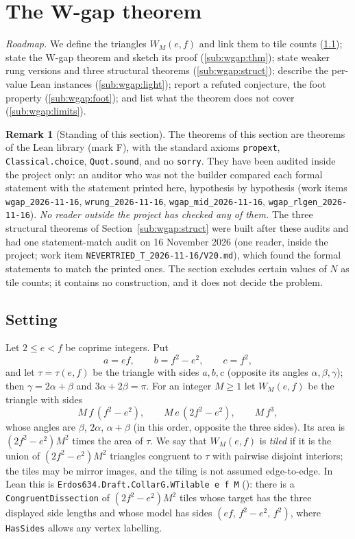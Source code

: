 \documentclass[11pt,reqno]{amsart}
\theoremstyle{plain}
\theoremstyle{definition}
\newtheorem{remark}[theorem]{Remark}
\newcommand{\sF}{\textup{\textsf{F}}}
\newcommand{\rec}[1]{\textup{\texttt{#1}}}
\begin{document}
\section{The W-gap theorem}\label{sec:wgap}

\emph{Roadmap.} We define the triangles $W_M(e,f)$ and link them to tile counts (\ref{sub:wgap:setting}); state the
W-gap theorem and sketch its proof (\ref{sub:wgap:thm}); state weaker rung versions and three structural theorems
(\ref{sub:wgap:struct}); describe the per-value Lean instances (\ref{sub:wgap:light}); report a refuted conjecture,
the foot property (\ref{sub:wgap:foot}); and list what the theorem does not cover (\ref{sub:wgap:limits}).

\begin{remark}[Standing of this section]\label{rem:wgap:status}
The theorems of this section are theorems of the Lean library (mark \sF), with the standard axioms
\texttt{propext}, \texttt{Classical.choice}, \texttt{Quot.sound}, and no \texttt{sorry}. They have been audited
inside the project only: an auditor who was not the builder compared each formal statement with the statement
printed here, hypothesis by hypothesis (work items \rec{wgap\_2026-11-16}, \rec{wrung\_2026-11-16},
\rec{wgap\_mid\_2026-11-16}, \rec{wgap\_rlgen\_2026-11-16}). \emph{No reader outside the project has checked
any of them.} The three structural theorems of Section~\ref{sub:wgap:struct} were built after these audits and
had one statement-match audit on 16 November 2026 (one reader, inside the project; work item
\rec{NEVERTRIED\_T\_2026-11-16/V20.md}), which found the formal statements to match the printed ones. The section excludes certain values of $N$ as tile counts; it contains no
construction, and it does not decide the problem.
\end{remark}

\subsection{Setting}\label{sub:wgap:setting}
Let $2\le e<f$ be coprime integers. Put
\[
 a=ef,\qquad b=f^2-e^2,\qquad c=f^2,
\]
and let $\tau=\tau(e,f)$ be the triangle with sides $a,b,c$ (opposite its angles $\alpha,\beta,\gamma$); then
$\gamma=2\alpha+\beta$ and $3\alpha+2\beta=\pi$. For an integer $M\ge1$ let $W_M(e,f)$ be the triangle with sides
\[
 M\,f\,(f^2-e^2),\qquad M\,e\,(2f^2-e^2),\qquad M\,f^3,
\]
whose angles are $\beta$, $2\alpha$, $\alpha+\beta$ (in this order, opposite the three sides). Its area is
$(2f^2-e^2)M^2$ times the area of $\tau$. We say that $W_M(e,f)$ is \emph{tiled} if it is the union of
$(2f^2-e^2)M^2$ triangles congruent to $\tau$ with pairwise disjoint interiors; the tiles may be mirror images,
and the tiling is not assumed edge-to-edge. In Lean this is
\texttt{Erdos634.Draft.CollarG.WTilable e f M} (): there is a
\texttt{CongruentDissection} of $(2f^2-e^2)M^2$ tiles whose target has the three displayed side lengths and whose
model has sides $(ef,\,f^2-e^2,\,f^2)$, where \texttt{HasSides} allows any vertex labelling.
\end{document}

